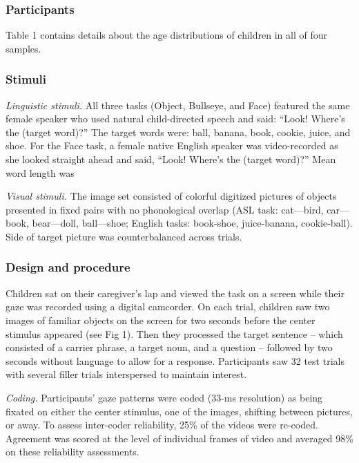 \documentclass[10pt, letterpaper]{article}
\begin{document}
\subsubsection{Participants}\label{participants}

Table 1 contains details about the age distributions of children in all
of four samples.

\subsubsection{Stimuli}\label{stimuli}

\emph{Linguistic stimuli.} All three tasks (Object, Bullseye, and Face)
featured the same female speaker who used natural child-directed speech
and said: ``Look! Where's the (target word)?'' The target words were:
ball, banana, book, cookie, juice, and shoe. For the Face task, a female
native English speaker was video-recorded as she looked straight ahead
and said, ``Look! Where's the (target word)?'' Mean word length was

\emph{Visual stimuli.} The image set consisted of colorful digitized
pictures of objects presented in fixed pairs with no phonological
overlap (ASL task: cat---bird, car---book, bear---doll, ball---shoe;
English tasks: book-shoe, juice-banana, cookie-ball). Side of target
picture was counterbalanced across trials.

\subsubsection{Design and procedure}\label{design-and-procedure}

Children sat on their caregiver's lap and viewed the task on a screen
while their gaze was recorded using a digital camcorder. On each trial,
children saw two images of familiar objects on the screen for two
seconds before the center stimulus appeared (see Fig 1). Then they
processed the target sentence -- which consisted of a carrier phrase, a
target noun, and a question -- followed by two seconds without language
to allow for a response. Participants saw 32 test trials with several
filler trials interspersed to maintain interest.

\emph{Coding.} Participants' gaze patterns were coded (33-ms resolution)
as being fixated on either the center stimulus, one of the images,
shifting between pictures, or away. To assess inter-coder reliability,
25\% of the videos were re-coded. Agreement was scored at the level of
individual frames of video and averaged 98\% on these reliability
assessments.
\end{document}
